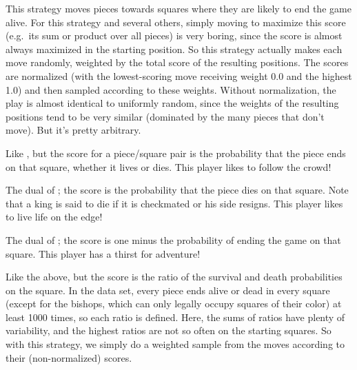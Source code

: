 \documentclass[10pt,preprint,twocolumn]{acmart}
\begin{document}



 This strategy moves pieces towards squares where
they are likely to end the game alive. For this strategy and several
others, simply moving to maximize this score (e.g.~its sum or product
over all pieces) is very boring, since the score is almost always
maximized in the starting position. So this strategy actually makes
each move randomly, weighted by the total score of the resulting
positions. The scores are normalized (with the lowest-scoring move
receiving weight 0.0 and the highest 1.0) and then sampled according
to these weights. Without normalization, the play is almost identical
to uniformly random, since the weights of the resulting positions tend
to be very similar (dominated by the many pieces that don't move). But
it's pretty arbitrary. \stateful

 Like , but the score for a
piece/square pair is the probability that the piece ends on that
square, whether it lives or dies. This player likes to follow the
crowd! \stateful

 The dual of ; the score is the
probability that the piece dies on that square. Note that a king is
said to die if it is checkmated or his side resigns. This player likes
to live life on the edge! \stateful

 The dual of ; the score
is one minus the probability of ending the game on that square. This
player has a thirst for adventure! \stateful

 Like the above, but the score is the
ratio of the survival and death probabilities on the square. In the
data set, every piece ends alive or dead in every square (except
for the bishops, which can only legally occupy squares of their
color) at least 1000 times, so each ratio is defined. Here, the
sums of ratios have plenty of variability, and the highest
ratios are not so often on the starting squares. So with this
strategy, we simply do a weighted sample from the moves according
to their (non-normalized) scores. \stateful
\end{document}
